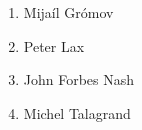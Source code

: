 \begin{exampletwoup}
\begin{enumerate}
\item  Mijaíl Grómov

\item Peter Lax

\item John Forbes Nash

\item Michel Talagrand
\end{enumerate}
\end{exampletwoup}
